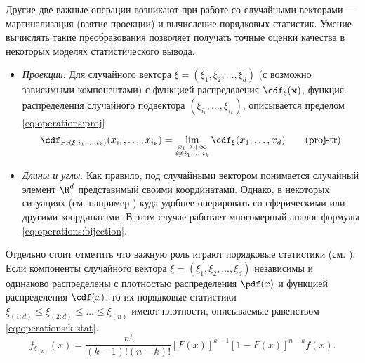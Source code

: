 \noindent Другие две важные операции возникают при работе со случайными векторами --- маргинализация (взятие проекции) и вычисление порядковых статистик. Умение вычислять такие преобразования позволяет получать точные оценки качества в некоторых моделях статистического вывода. 
\begin{itemize}
    \item \emph{Проекции}. Для случайного вектора \(\xi=(\xi_1, \xi_2, \ldots, \xi_d)\)  (с возможно зависимыми компонентами) с  функцией распределения $\cdf_{\xi}(\mathbf{x})$, функция распределения случайного  подвектора $(\xi_{i_1}, \ldots,\xi_{i_k})$, описывается пределом \eqref{eq:operations:proj}
    \begin{equation}
        \label{eq:operations:proj}
        \cdf_{\Pr(\xi; i_1,\ldots,i_k)}(x_{i_1},\ldots, x_{i_k}) = \lim_{\substack{x_i \to+\infty\\ i \neq i_1,\ldots,i_k}}\cdf_{\xi}(x_1,\ldots,x_d)  \tag{proj-tr}
    \end{equation}
    \item \emph{Длины и углы}. Как правило, под случайными вектором понимается случайный элемент $\R^d$ представимый своими координатами. Однако, в некоторых ситуациях (см. например \cite{hernandez2017general}) куда удобнее оперировать со сферическими или другими координатами. В этом случае работает многомерный аналог формулы \eqref{eq:operations:bijection}.
\end{itemize}
Отдельно стоит отметить что важную роль играют порядковые статистики (см{.} \cite{lehmann1975statistical}). Если компоненты случайного вектора \(\xi=(\xi_1, \xi_2, \ldots, \xi_d)\) независимы и одинаково распределены с плотностью распределения $\pdf(x)$ и функцией распределения $\cdf(x)$, то их порядковые статистики \( \xi_{(1:d)} \leq \xi_{(2:d)} \leq \ldots \leq \xi_{(n)} \) имеют плотности, описываемые равенством \eqref{eq:operations:k-stat}.
\begin{equation}
    \label{eq:operations:k-stat}
    f_{\xi_{(k)}}(x) = \frac{n!}{(k-1)!(n-k)!} [F(x)]^{k-1} [1 - F(x)]^{n-k} f(x). \tag{ord-stat}
\end{equation}


